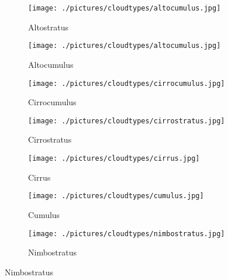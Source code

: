 \begin{figure}[h]
		\centering
		\begin{subfigure}[b]{0.31\textwidth}
		\begin{center}
				\texttt{[image: ./pictures/cloudtypes/altocumulus.jpg]}
		\end{center}
		\caption{Altostratus}
		\label{fig:altostratus}
		\end{subfigure}
		\begin{subfigure}[b]{0.31\textwidth}
		\begin{center}
				\texttt{[image: ./pictures/cloudtypes/altocumulus.jpg]}
		\end{center}
		\caption{Altocumulus}
		\label{fig:altocumulus}
		\end{subfigure}
		\begin{subfigure}[b]{0.31\textwidth}
		\begin{center}
				\texttt{[image: ./pictures/cloudtypes/cirrocumulus.jpg]}
		\end{center}
		\caption{Cirrocumulus}
		\label{fig:cirrocumulus}
		\end{subfigure}
		\begin{subfigure}[b]{0.31\textwidth}
		\begin{center}
				\texttt{[image: ./pictures/cloudtypes/cirrostratus.jpg]}
		\end{center}
		\caption{Cirrostratus}
		\label{fig:cirrostratus}
		\end{subfigure}
		\begin{subfigure}[b]{0.31\textwidth}
		\begin{center}
				\texttt{[image: ./pictures/cloudtypes/cirrus.jpg]}
		\end{center}
		\caption{Cirrus}
		\label{fig:cirrus}
		\end{subfigure}
		\begin{subfigure}[b]{0.31\textwidth}
		\begin{center}
				\texttt{[image: ./pictures/cloudtypes/cumulus.jpg]}
		\end{center}
		\caption{Cumulus}
		\label{fig:Cumulus}
		\end{subfigure}
		\begin{subfigure}[b]{0.31\textwidth}
		\begin{center}
				\texttt{[image: ./pictures/cloudtypes/nimbostratus.jpg]}
		\end{center}
		\caption{Nimbostratus}

\end{subfigure}
\end{figure}

